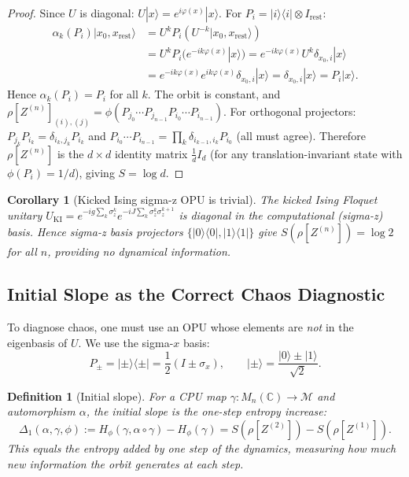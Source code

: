 \documentclass[12pt,a4paper]{article}
\newtheorem{corollary}[theorem]{Corollary}
\newtheorem{definition}[theorem]{Definition}
\newcommand{\CC}{\mathbb{C}}
\newcommand{\Mn}{M_n(\CC)}
\newcommand{\vN}{\mathcal{M}}      %
\newcommand{\Hphi}{H_{\phi}}
\begin{document}
\begin{proof}
Since $U$ is diagonal: $U|x\rangle = e^{i\varphi(x)}|x\rangle$.
For $P_i = |i\rangle\langle i|\otimes I_\mathrm{rest}$:
\begin{align*}
  \alpha_k(P_i)|x_0,x_\mathrm{rest}\rangle
  &= U^k P_i (U^{-k}|x_0,x_\mathrm{rest}\rangle)\\
  &= U^k P_i\bigl(e^{-ik\varphi(x)}|x\rangle\bigr)
  = e^{-ik\varphi(x)} U^k \delta_{x_0,i}|x\rangle\\
  &= e^{-ik\varphi(x)} e^{ik\varphi(x)} \delta_{x_0,i}|x\rangle
  = \delta_{x_0,i}|x\rangle = P_i|x\rangle.
\end{align*}
Hence $\alpha_k(P_i)=P_i$ for all $k$.  The orbit is constant, and
$\rho[Z^{(n)}]_{(i),(j)} = \phi(P_{j_0}\cdots P_{j_{n-1}}P_{i_0}\cdots P_{i_{n-1}})$.
For orthogonal projectors: $P_{j_{k}}P_{i_k} = \delta_{i_k,j_k}P_{i_k}$ and
$P_{i_0}\cdots P_{i_{n-1}} = \prod_k \delta_{i_{k-1},i_k} P_{i_0}$ (all must agree).
Therefore $\rho[Z^{(n)}]$ is the $d\times d$ identity matrix $\frac{1}{d}I_d$
(for any translation-invariant state with $\phi(P_i)=1/d$), giving $S=\log d$.
\end{proof}

\begin{corollary}[Kicked Ising sigma-z OPU is trivial]\label{cor:ki_trivial}
The kicked Ising Floquet unitary
$U_\mathrm{KI}=e^{-ig\sum_k\sigma_z^k}e^{-iJ\sum_k\sigma_z^k\sigma_z^{k+1}}$
is diagonal in the computational (sigma-z) basis.  Hence sigma-z basis projectors
$\{|0\rangle\langle 0|,|1\rangle\langle 1|\}$ give $S(\rho[Z^{(n)}])=\log 2$ for all $n$,
providing no dynamical information.
\end{corollary}

\subsection{Initial Slope as the Correct Chaos Diagnostic}

To diagnose chaos, one must use an OPU whose elements are \emph{not} in the
eigenbasis of $U$.  We use the sigma-$x$ basis:
\begin{equation}\label{eq:sx_opu}
  P_\pm = |{\pm}\rangle\langle{\pm}| = \frac{1}{2}(I\pm\sigma_x),
  \qquad |{\pm}\rangle = \frac{|0\rangle\pm|1\rangle}{\sqrt{2}}.
\end{equation}

\begin{definition}[Initial slope]\label{def:initial_slope}
For a CPU map $\gamma:\Mn\to\vN$ and automorphism $\alpha$, the \emph{initial slope}
is the one-step entropy increase:
\begin{equation}\label{eq:initial_slope}
  \Delta_1(\alpha,\gamma,\phi)
  := \Hphi(\gamma,\alpha\circ\gamma) - \Hphi(\gamma)
  = S(\rho[Z^{(2)}]) - S(\rho[Z^{(1)}]).
\end{equation}
This equals the entropy added by one step of the dynamics, measuring how much new
information the orbit generates at each step.
\end{definition}
\end{document}
